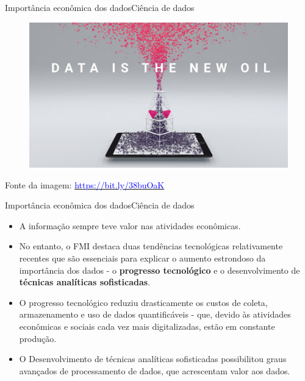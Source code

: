\documentclass[t]{beamer}
\begin{document}

\begin{ftst}{Importância econômica dos dados}{Ciência de dados}
\begin{figure}
    \centering
    \includegraphics[scale=0.27]{Figuras/slide00_04.jpg}
\end{figure}
\scriptsize
Fonte da imagem: \href{https://bit.ly/38buOaK}{\textcolor{blue}{https://bit.ly/38buOaK}}

\end{ftst}


\begin{ftst}{Importância econômica dos dados}{Ciência de dados}
\small
\begin{itemize}
    \item A informação sempre teve valor nas atividades econômicas. 
    \item No entanto, o FMI destaca duas tendências tecnológicas relativamente recentes que são essenciais para explicar o aumento estrondoso da importância dos dados - o \textbf{progresso tecnológico} e o desenvolvimento de \textbf{técnicas analíticas sofisticadas}.
    \item O progresso tecnológico reduziu drasticamente os custos de coleta, armazenamento e uso de dados quantificáveis - que, devido às atividades econômicas e sociais cada vez mais digitalizadas, estão em constante produção.
    \item O Desenvolvimento de técnicas analíticas sofisticadas possibilitou graus avançados de processamento de dados, que acrescentam valor aos dados.
\end{itemize}

\end{ftst}
\end{document}
